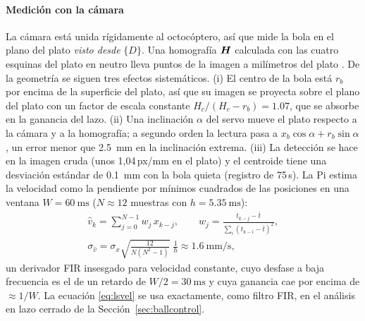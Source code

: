 \paragraph{Medición con la cámara}
La cámara está unida rígidamente al octocóptero, así que mide la bola en el plano del plato \emph{visto desde} $\{D\}$. Una homografía $\bm{H}$ calculada con las cuatro esquinas del plato en neutro lleva puntos de la imagen a milímetros del plato \cite{hartley2004}. De la geometría se siguen tres efectos sistemáticos. (i) El centro de la bola está $r_b$ por encima de la superficie del plato, así que su imagen se proyecta sobre el plano del plato con un factor de escala constante $H_c/(H_c-r_b)=1.07$, que se absorbe en la ganancia del lazo. (ii) Una inclinación $\alpha$ del servo mueve el plato respecto a la cámara y a la homografía; a segundo orden la lectura pasa a $x_b\cos\alpha+r_b\sin\alpha$, un error menor que \SI{2.5}{\milli\metre} en la inclinación extrema. (iii) La detección se hace en la imagen cruda (unos 1,04\,px/mm en el plato) y el centroide tiene una desviación estándar de \SI{0.1}{\milli\metre} con la bola quieta (registro de 75\,s). La Pi estima la velocidad como la pendiente por mínimos cuadrados de las posiciones en una ventana $W=\SI{60}{\milli\second}$ ($N\approx12$ muestras con $h=\SI{5.35}{\milli\second}$):
\begin{gather}
  \hat v_k=\sum_{j=0}^{N-1}w_j\,x_{k-j},\qquad w_j=\frac{t_{k-j}-\bar t}{\sum_i (t_{k-i}-\bar t)^2}, \label{eq:lsvel}\\
  \sigma_{\hat v}=\sigma_x\sqrt{\frac{12}{N(N^2-1)}}\;\frac1h\approx\SI{1.6}{\milli\metre\per\second}, \nonumber
\end{gather}
un derivador FIR insesgado para velocidad constante, cuyo desfase a baja frecuencia es el de un retardo de $W/2=\SI{30}{\milli\second}$ y cuya ganancia cae por encima de $\approx1/W$. La ecuación \eqref{eq:lsvel} se usa exactamente, como filtro FIR, en el análisis en lazo cerrado de la Sección~\ref{sec:ballcontrol}.
